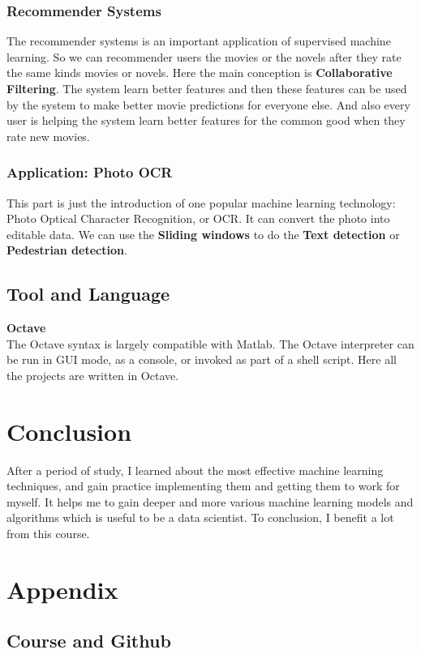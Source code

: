 \documentclass[a4paper]{article}
\begin{document}
{\subsubsection{\textbf{Recommender Systems}}

The recommender systems is an important application of supervised machine learning. So we can recommender users the movies or the novels after they rate the same kinds movies or novels. Here the main conception is \textbf{Collaborative Filtering}. The system learn better features and then these features can be used by the system to make better movie predictions for everyone else. And also every user is helping the system learn better features for the common good when they rate new movies. 
\subsubsection{\textbf{Application: Photo OCR}}
This part is just the introduction of one popular machine learning technology: Photo Optical Character Recognition, or OCR.  It can convert the photo into editable data. We can use the \textbf{Sliding windows} to do the \textbf{Text detection} or \textbf{Pedestrian  detection}.

\subsection{Tool and Language}
\textbf{Octave}\\
The Octave syntax is largely compatible with Matlab. The Octave interpreter can be run in GUI mode, as a console, or invoked as part of a shell script. Here all the projects are written in Octave.

\newpage
\section{Conclusion}
After a period of study, I learned about the most effective machine learning techniques, and gain practice implementing them and getting them to work for myself. It helps me to gain deeper and more various machine learning models and algorithms which is useful to be a data scientist. To conclusion, I benefit a lot from this course.
}
\section{Appendix}
\subsection{Course and Github}
\end{document}
